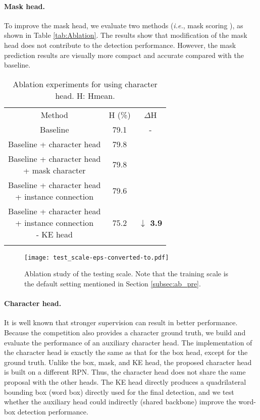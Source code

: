 \paragraph{Mask head.} To improve the mask head, we evaluate two methods (\textit{i.e.}, mask scoring \cite{huang2019mask}), as shown in Table \ref{tab:Ablation}. The results show that modification of the mask head does not contribute to the detection performance. However, the mask prediction results are visually more compact and accurate compared with the baseline. 
\begin{table}[t!]
  \caption{Ablation  experiments for using character head. H: Hmean.}
  \label{tab:character}       \centering
\begin{tabular}{ccc}
  \hline\noalign{\smallskip}
  Method & H (\%)  & $\Delta$H\\
  \noalign{\smallskip}\hline\noalign{\smallskip}
  Baseline & 79.1 & - \\
  \hline
  Baseline + character head  & 79.8 & \bf \color{red}{$\uparrow$ 0.7} \\
\makecell*[c]{Baseline + character head \\+ mask character} & 79.8 & \bf \color{red}{$\uparrow$ 0.7} \\
  \makecell*[c]{Baseline + character head \\+ instance connection} & 79.6 & \bf \color{red}{$\uparrow$ 0.5} \\
  \makecell*[c]{Baseline + character head \\+ instance connection \\ - KE head} & 75.2 & \bf \textcolor[RGB]{0,160,0}{$\downarrow$ 3.9} \\
  \noalign{\smallskip}\hline
  \end{tabular}
\end{table}

\begin{figure*}[!t]
  \centering
  \centerline{\texttt{[image: test\_scale-eps-converted-to.pdf]}}
  \caption{Ablation study of the testing scale. Note that the training scale is the default setting mentioned in Section \ref{subsec:ab_pre}.}\label{fig:test_scale}
\end{figure*}


\paragraph{Character head.} 
It is well known
that stronger supervision can result in better performance. Because the competition also provides a character ground truth, we build and evaluate  the performance of an auxiliary character head. The implementation of the character head is exactly the same as that for the box head, except for the ground truth. Unlike the box, mask, and KE head, the proposed character head is built on a different RPN. Thus, the character head does not share the same proposal with the other heads. The KE head directly produces 
a quadrilateral bounding box (word box) directly used for the final detection, and we test whether the auxiliary head could indirectly (shared backbone) improve the word-box detection performance. 

